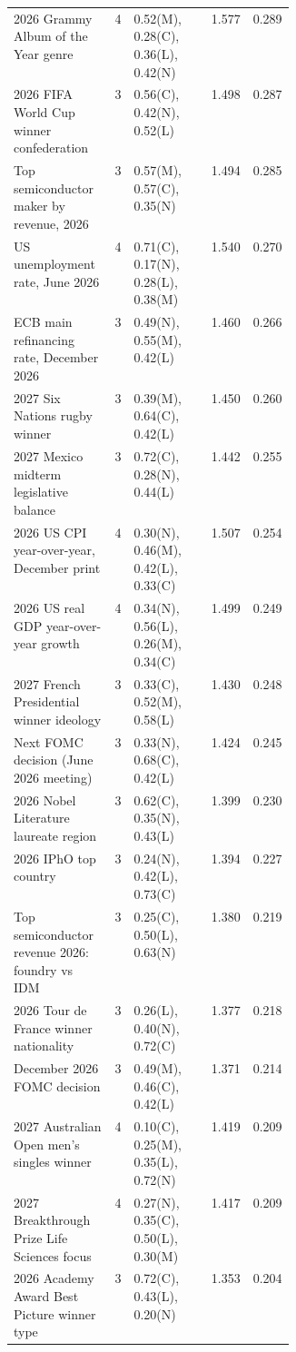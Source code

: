 \begin{longtable}{p{0.36\linewidth} c l r r}
2026 Grammy Album of the Year genre & 4 & \scriptsize 0.52(M), 0.28(C), 0.36(L), 0.42(N) & 1.577 & 0.289 \\
2026 FIFA World Cup winner confederation & 3 & \scriptsize 0.56(C), 0.42(N), 0.52(L) & 1.498 & 0.287 \\
Top semiconductor maker by revenue, 2026 & 3 & \scriptsize 0.57(M), 0.57(C), 0.35(N) & 1.494 & 0.285 \\
US unemployment rate, June 2026 & 4 & \scriptsize 0.71(C), 0.17(N), 0.28(L), 0.38(M) & 1.540 & 0.270 \\
ECB main refinancing rate, December 2026 & 3 & \scriptsize 0.49(N), 0.55(M), 0.42(L) & 1.460 & 0.266 \\
2027 Six Nations rugby winner & 3 & \scriptsize 0.39(M), 0.64(C), 0.42(L) & 1.450 & 0.260 \\
2027 Mexico midterm legislative balance & 3 & \scriptsize 0.72(C), 0.28(N), 0.44(L) & 1.442 & 0.255 \\
2026 US CPI year-over-year, December print & 4 & \scriptsize 0.30(N), 0.46(M), 0.42(L), 0.33(C) & 1.507 & 0.254 \\
2026 US real GDP year-over-year growth & 4 & \scriptsize 0.34(N), 0.56(L), 0.26(M), 0.34(C) & 1.499 & 0.249 \\
2027 French Presidential winner ideology & 3 & \scriptsize 0.33(C), 0.52(M), 0.58(L) & 1.430 & 0.248 \\
Next FOMC decision (June 2026 meeting) & 3 & \scriptsize 0.33(N), 0.68(C), 0.42(L) & 1.424 & 0.245 \\
2026 Nobel Literature laureate region & 3 & \scriptsize 0.62(C), 0.35(N), 0.43(L) & 1.399 & 0.230 \\
2026 IPhO top country & 3 & \scriptsize 0.24(N), 0.42(L), 0.73(C) & 1.394 & 0.227 \\
Top semiconductor revenue 2026: foundry vs IDM & 3 & \scriptsize 0.25(C), 0.50(L), 0.63(N) & 1.380 & 0.219 \\
2026 Tour de France winner nationality & 3 & \scriptsize 0.26(L), 0.40(N), 0.72(C) & 1.377 & 0.218 \\
December 2026 FOMC decision & 3 & \scriptsize 0.49(M), 0.46(C), 0.42(L) & 1.371 & 0.214 \\
2027 Australian Open men's singles winner & 4 & \scriptsize 0.10(C), 0.25(M), 0.35(L), 0.72(N) & 1.419 & 0.209 \\
2027 Breakthrough Prize Life Sciences focus & 4 & \scriptsize 0.27(N), 0.35(C), 0.50(L), 0.30(M) & 1.417 & 0.209 \\
2026 Academy Award Best Picture winner type & 3 & \scriptsize 0.72(C), 0.43(L), 0.20(N) & 1.353 & 0.204 \\

\end{longtable}
